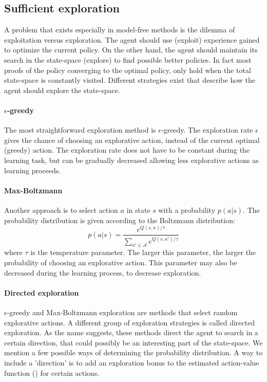 \documentclass[a4paper,11pt]{mscLiterature}
\begin{document}
	\subsection{Sufficient exploration}\label{sec:exploration}
	A problem that exists especially in model-free methods is the dilemma of exploitation versus exploration. The agent should use (exploit) experience gained to optimize the current policy. On the other hand, the agent should maintain its search in the state-space (explore) to find possible better policies. In fact most proofs of the policy converging to the optimal policy, only hold when the total state-space is constantly visited. Different strategies exist that describe how the agent should explore the state-space.
	
	\paragraph{$\epsilon$-greedy}
	The most straightforward exploration method is $\epsilon$-greedy. The exploration rate $\epsilon$ gives the chance of choosing an explorative action, instead of the current optimal (greedy) action. The exploration rate does not have to be constant during the learning task, but can be gradually decreased allowing less explorative actions as learning proceeds.
	
	\paragraph{Max-Boltzmann}
	Another approach is to select action $a$ in state $s$ with a probability $p(a|s)$. The probability distribution is given according to the Boltzmann distribution:
	\begin{equation}
		p(a|s) = \frac{e^{Q(s,a)/\tau}}{\sum_{a'\in \mathcal{A}}{e^{Q(s,a')/\tau}}}
	\end{equation}
	where $\tau$ is the temperature parameter. The larger this parameter, the larger the probability of choosing an explorative action. This parameter may also be decreased during the learning process, to decrease exploration.
		
	\paragraph{Directed exploration}
	$\epsilon$-greedy and Max-Boltzmann exploration are methods that select random explorative actions. A different group of exploration strategies is called directed exploration. As the name suggests, these methods direct the agent to search in a certain direction, that could possibly be an interesting part of the state-space. We mention a few possible ways of determining the probability distribution. A way to include a 'direction' is to add an exploration bonus to the estimated action-value function (\cite{Bakker:06}) for certain actions.
	
\end{document}
